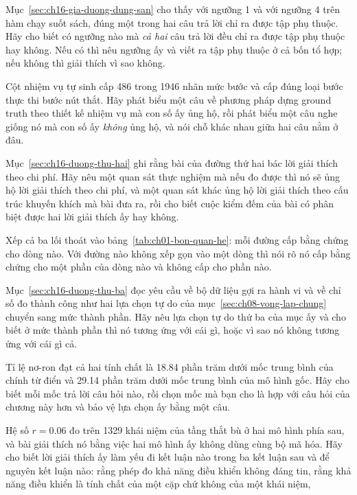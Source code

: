 \cauhoi
\begin{cauhoids}
  \item Mục~\ref{sec:ch16-gia-duong-dung-san} cho thấy với ngưỡng 1 và với ngưỡng
4 trên hàm chạy suốt sách, đúng một trong hai câu trả lời chỉ ra được tập phụ
thuộc. Hãy cho biết có ngưỡng nào mà \emph{cả hai} câu trả lời đều chỉ ra được
tập phụ thuộc hay không. Nếu có thì nêu ngưỡng ấy và viết ra tập phụ thuộc ở cả
bốn tổ hợp; nếu không thì giải thích vì sao không.
  \item Cột nhiệm vụ tự sinh cấp 486 trong 1946 nhãn mức bước và cấp đúng loại
bước thực thi bước nút thắt. Hãy phát biểu một câu về phương pháp dựng ground
truth theo thiết kế nhiệm vụ mà con số ấy ủng hộ, rồi phát biểu một câu nghe
giống nó mà con số ấy \emph{không} ủng hộ, và nói chỗ khác nhau giữa hai câu nằm
ở đâu.
  \item Mục~\ref{sec:ch16-duong-thu-hai} ghi rằng bài của đường thứ hai bác lời
giải thích theo chi phí. Hãy nêu một quan sát thực nghiệm mà nếu đo được thì nó
sẽ ủng hộ lời giải thích theo chi phí, và một quan sát khác ủng hộ lời giải
thích theo cấu trúc khuyến khích mà bài đưa ra, rồi cho biết cuộc kiểm đếm của
bài có phân biệt được hai lời giải thích ấy hay không.
  \item Xếp cả ba lối thoát vào bảng~\ref{tab:ch01-bon-quan-he}: mỗi đường cấp
bằng chứng cho dòng nào. Với đường nào không xếp gọn vào một dòng thì nói rõ nó
cấp bằng chứng cho một phần của dòng nào và không cấp cho phần nào.
  \item Mục~\ref{sec:ch16-duong-thu-ba} đọc yêu cầu về bộ dữ liệu gợi ra hành vi
và về chỉ số đo thành công như hai lựa chọn tự do của
mục~\ref{sec:ch08-vong-lap-chung} chuyển sang mức thành phần. Hãy nêu lựa chọn
tự do thứ ba của mục ấy và cho biết ở mức thành phần thì nó tương ứng với cái
gì, hoặc vì sao nó không tương ứng với cái gì cả.
  \item Tỉ lệ nơ-ron đạt cả hai tính chất là 18.84 phần trăm dưới mốc trung bình
của chính từ điển và 29.14 phần trăm dưới mốc trung bình của mô hình gốc. Hãy
cho biết mỗi mốc trả lời câu hỏi nào, rồi chọn mốc mà bạn cho là hợp với câu hỏi
của chương này hơn và bảo vệ lựa chọn ấy bằng một câu.
  \item Hệ số $r = 0.06$ đo trên 1329 khái niệm của tầng thắt bù ở hai mô hình
phía sau, và bài giải thích nó bằng việc hai mô hình ấy không dùng cùng bộ mã
hóa. Hãy cho biết lời giải thích ấy làm yếu đi kết luận nào trong ba kết luận
sau và để nguyên kết luận nào: rằng phép đo khả năng điều khiển không đáng tin,
rằng khả năng điều khiển là tính chất của một cặp chứ không của một khái niệm,

\end{cauhoids}

